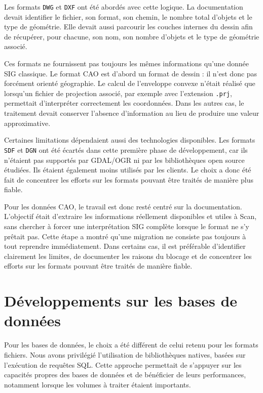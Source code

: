 Les formats \texttt{DWG} et \texttt{DXF} ont été abordés avec cette logique. La
documentation devait identifier le fichier, son format, son chemin, le nombre
total d'objets et le type de géométrie. Elle devait aussi parcourir les
couches internes du dessin afin de récupérer, pour chacune, son nom, son nombre
d'objets et le type de géométrie associé.

Ces formats ne fournissent pas toujours les mêmes informations qu'une donnée SIG
classique. Le format CAO est d'abord un format de dessin : il n'est donc pas
forcément orienté géographie. Le calcul de l'enveloppe convexe n'était réalisé
que lorsqu'un fichier de projection associé, par exemple avec l'extension
\texttt{.prj}, permettait d'interpréter correctement les coordonnées. Dans les
autres cas, le traitement devait conserver l'absence d'information au lieu de
produire une valeur approximative.

Certaines limitations dépendaient aussi des technologies disponibles. Les
formats \texttt{SDF} et \texttt{DGN} ont été écartés dans cette première phase de
développement, car ils n'étaient pas supportés par GDAL/OGR ni par
les bibliothèques open source étudiées. Ils étaient également moins utilisés par
les clients. Le choix a donc été fait de concentrer les efforts sur les formats
pouvant être traités de manière plus fiable.

Pour les données CAO, le travail est donc resté centré sur la documentation.
L'objectif était d'extraire les informations réellement disponibles et utiles à
Scan, sans chercher à forcer une interprétation SIG complète lorsque le format ne
s'y prêtait pas. Cette étape a montré qu'une migration ne consiste pas toujours à
tout reprendre immédiatement. Dans certains cas, il est préférable d'identifier
clairement les limites, de documenter les raisons du blocage et de concentrer les
efforts sur les formats pouvant être traités de manière fiable.


\section{Développements sur les bases de données}
\label{sec:bases_formats_avances}

Pour les bases de données, le choix a été différent de celui retenu pour les
formats fichiers. Nous avons privilégié l'utilisation de bibliothèques natives,
basées sur l'exécution de requêtes SQL. Cette approche permettait de s'appuyer
sur les capacités propres des bases de données et de bénéficier de leurs
performances, notamment lorsque les volumes à traiter étaient importants.

